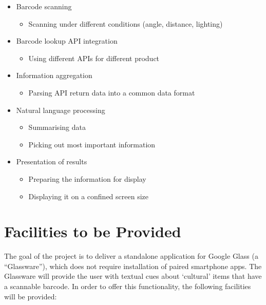 \documentclass[12pt,a4paper]{report}
\begin{document}
\begin{itemize}
	\item Barcode scanning
	\begin{itemize}
		\item Scanning under different conditions (angle, distance, lighting)
	\end{itemize}
	\item Barcode lookup API integration
	\begin{itemize}
		\item Using different APIs for different product
	\end{itemize}
	\item Information aggregation
	\begin{itemize}
		\item Parsing API return data into a common data format
	\end{itemize}
	\item Natural language processing
	\begin{itemize}
		\item Summarising data
		\item Picking out most important information
	\end{itemize}
	\item Presentation of results
	\begin{itemize}
		\item Preparing the information for display
		\item Displaying it on a confined screen size
	\end{itemize}
\end{itemize}



\chapter{Facilities to be Provided}

The goal of the project is to deliver a standalone application for Google Glass (a ``Glassware''), which does not require installation of paired smartphone apps.
The Glassware will provide the user with textual cues about ‘cultural’ items that have a scannable barcode. In order to offer this functionality, the following facilities will be provided:
\end{document}
